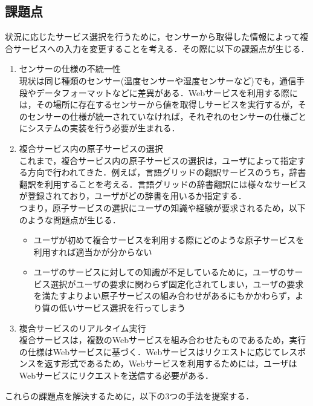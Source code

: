 \documentclass{kuisthesis}			%
\begin{document}
\subsection{課題点}
状況に応じたサービス選択を行うために，センサーから取得した情報によって複合サービスへの入力を変更することを考える．その際に以下の課題点が生じる．
\begin{enumerate}
\item センサーの仕様の不統一性\\
現状は同じ種類のセンサー(温度センサーや湿度センサーなど)でも，通信手段やデータフォーマットなどに差異がある．Webサービスを利用する際には，その場所に存在するセンサーから値を取得しサービスを実行するが，そのセンサーの仕様が統一されていなければ，それぞれのセンサーの仕様ごとにシステムの実装を行う必要が生まれる．
\item 複合サービス内の原子サービスの選択\\
これまで，複合サービス内の原子サービスの選択は，ユーザによって指定する方向で行われてきた．例えば，言語グリッドの翻訳サービスのうち，辞書翻訳を利用することを考える．言語グリッドの辞書翻訳には様々なサービスが登録されており，ユーザがどの辞書を用いるか指定する．\\
つまり，原子サービスの選択にユーザの知識や経験が要求されるため，以下のような問題点が生じる．
\begin{itemize}
\item ユーザが初めて複合サービスを利用する際にどのような原子サービスを利用すれば適当かが分からない
\item ユーザのサービスに対しての知識が不足しているために，ユーザのサービス選択がユーザの要求に関わらず固定化されてしまい，ユーザの要求を満たすよりよい原子サービスの組み合わせがあるにもかかわらず，より質の低いサービス選択を行ってしまう
\end{itemize}
\item 複合サービスのリアルタイム実行\\
複合サービスは，複数のWebサービスを組み合わせたものであるため，実行の仕様はWebサービスに基づく．Webサービスはリクエストに応じてレスポンスを返す形式であるため，Webサービスを利用するためには，ユーザはWebサービスにリクエストを送信する必要がある．
\end{enumerate}
これらの課題点を解決するために，以下の3つの手法を提案する．
\end{document}
